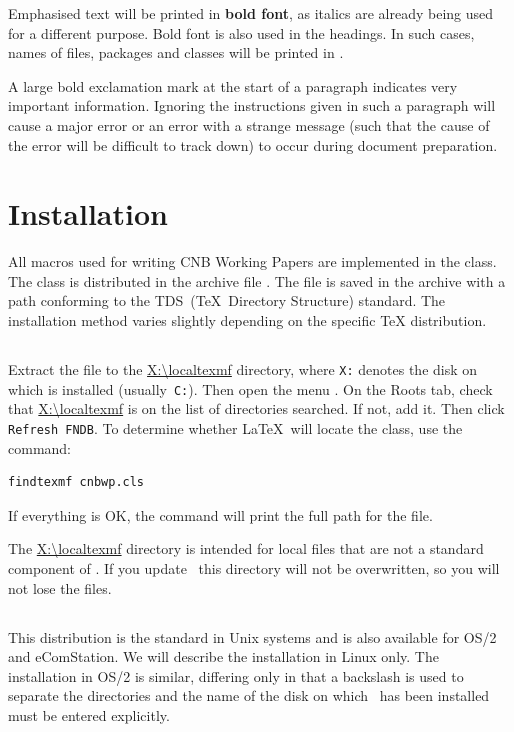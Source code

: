 \documentclass[12pt]{article}
\begin{document}
Emphasised text will be printed in \textbf{bold font}, as italics are already being used for a
different purpose. Bold font is also used in the headings. In such cases, names of files, packages
and classes will be printed in \textbf{}.

\pozor A large bold exclamation mark at the start of a paragraph indicates very important
information. Ignoring the instructions given in such a paragraph will cause a major error or an
error with a strange message (such that the cause of the error will be difficult to track down) to
occur during document preparation.

\section{Installation}\label{instalace} All macros used for writing CNB Working
Papers are implemented in the  class. The class is distributed in the archive file
. The file is saved in the archive with a path conforming to the TDS~(\TeX\ Directory
Structure) standard. The installation method varies slightly depending on the specific \TeX{}
distribution.

\subsection{\MikTeX}\label{inst.miktex} Extract the  file to the \url{X:\localtexmf}
directory, where \texttt{X:} denotes the disk on which \MikTeX{} is installed
(usually~\texttt{C:}). Then open the menu . On the
Roots tab, check that \url{X:\localtexmf} is on the list of directories searched. If not, add it.
Then click \texttt{Refresh FNDB}. To determine whether \LaTeX\ will locate the class, use
the command:

\begin{verbatim}
findtexmf cnbwp.cls
\end{verbatim}

\noindent If everything is OK, the command will print the full path for the 
file.

\pozor The \url{X:\localtexmf} directory is intended for local files that are not a
standard
component of \MikTeX. If you update \MikTeX\, this directory will not be overwritten, so
you will
not lose the files.

\subsection{\teTeX}\label{inst.tetex} This distribution is the standard in Unix systems
and is also
available for OS/2 and eComStation. We will describe the installation in Linux only. The
installation in OS/2 is similar, differing only in that a backslash is used to separate
the
directories and the name of the disk on which \teTeX\ has been installed must be entered
explicitly.
\end{document}
